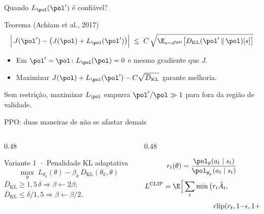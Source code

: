 \documentclass[aspectratio=169, 11pt]{beamer}
\newcommand{\Ahat}{\hat{A}}
\newcommand{\KL}{D_{\mathrm{KL}}}
\newcommand{\KLbar}{\overline{D}_{\mathrm{KL}}}
\DeclareMathOperator{\clipop}{clip}
\begin{document}
\begin{frame}{Quando $L_{\pol}(\pol')$ é confiável?}
  \begin{teobox}{Teorema (Achiam et al., 2017)}
    \[
      \Big|\,J(\pol') - \big(J(\pol) + L_{\pol}(\pol')\big)\Big| \;\le\;
        C\,\sqrt{\E_{s\sim d^{\pol}}\big[\KL(\pol'\,\|\,\pol)[s]\big]}
    \]
  \end{teobox}
  \begin{itemize}\small
    \item Em $\pol'=\pol$: $L_{\pol}(\pol)=0$ e mesmo gradiente que $J$.
    \item Maximizar $J(\pol)+L_{\pol}(\pol')-C\sqrt{\KLbar}$ garante melhoria.
  \end{itemize}
  \begin{alertabox}
    Sem restrição, maximizar $L_{\pol}$ empurra $\pol'/\pol\gg1$ para fora da região de validade.
  \end{alertabox}
\end{frame}

\begin{frame}{PPO: duas maneiras de não se afastar demais}
  \begin{columns}[T]
    \begin{column}{0.48\textwidth}
      \begin{teobox}{Variante 1 · Penalidade KL adaptativa}
        \small
        \[
          \max_\theta\; L_{\theta_k}(\theta) - \beta_k\,\KLbar(\theta_k,\theta)
        \]
        $\KLbar\ge1{,}5\,\delta \Rightarrow \beta\leftarrow2\beta$;\quad
        $\KLbar\le\delta/1{,}5 \Rightarrow \beta\leftarrow\beta/2$.
      \end{teobox}
    \end{column}
    \begin{column}{0.48\textwidth}
      \begin{exbox}[title={Variante 2 · Objetivo recortado}]{}
        \small
        \[
          r_t(\theta) = \frac{\pol_\theta(a_t\mid s_t)}{\pol_{\theta_k}(a_t\mid s_t)}
        \]
        \begin{align*}
          L^{\mathrm{CLIP}} = \E\Big[\sum_t\min\big(&r_t\Ahat_t,\\
            &\clipop(r_t,1{-}\epsilon,1{+}\epsilon)\,\Ahat_t\big)\Big]
        \end{align*}
      \end{exbox}
    \end{column}
  \end{columns}
\end{frame}
\end{document}
